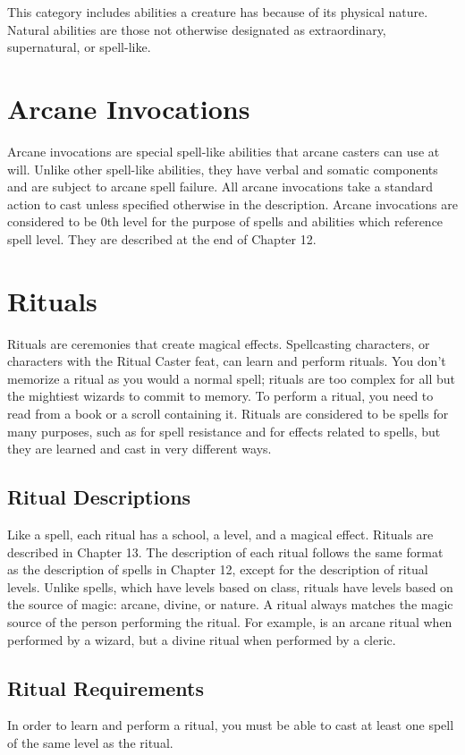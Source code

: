  This category includes abilities a creature has because of its physical nature. Natural abilities are those not otherwise designated as extraordinary, supernatural, or spell-like.

\section{Arcane Invocations}\label{Arcane Invocations}
Arcane invocations are special spell-like abilities that arcane casters can use at will. Unlike other spell-like abilities, they have verbal and somatic components and are subject to arcane spell failure. All arcane invocations take a standard action to cast unless specified otherwise in the description. Arcane invocations are considered to be 0th level for the purpose of spells and abilities which reference spell level. They are described at the end of Chapter 12.

\section{Rituals}\label{Rituals}
Rituals are ceremonies that create magical effects. Spellcasting characters, or characters with the Ritual Caster feat, can learn and perform rituals. You don't memorize a ritual as you would a normal spell; rituals are too complex for all but the mightiest wizards to commit to memory. To perform a ritual, you need to read from a book or a scroll containing it. Rituals are considered to be spells for many purposes, such as for spell resistance and for effects related to spells, but they are learned and cast in very different ways.
\subsection{Ritual Descriptions}
\par Like a spell, each ritual has a school, a level, and a magical effect. Rituals are described in Chapter 13. The description of each ritual follows the same format as the description of spells in Chapter 12, except for the description of ritual levels. Unlike spells, which have levels based on class, rituals have levels based on the source of magic: arcane, divine, or nature. A ritual always matches the magic source of the person performing the ritual. For example,  is an arcane ritual when performed by a wizard, but a divine ritual when performed by a cleric.
\subsection{Ritual Requirements} In order to learn and perform a ritual, you must be able to cast at least one spell of the same level as the ritual.
